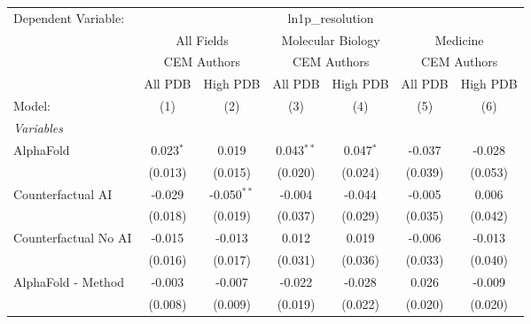 \begingroup
\centering
\begin{tabular}{lcccccc}
   \tabularnewline \midrule \midrule
   Dependent Variable: & \multicolumn{6}{c}{ln1p\_resolution}\\
 & \multicolumn{2}{c}{All Fields} & \multicolumn{2}{c}{Molecular Biology} & \multicolumn{2}{c}{Medicine} \\
\cmidrule(lr){2-3} \cmidrule(lr){4-5} \cmidrule(lr){6-7}
 & \multicolumn{2}{c}{CEM Authors} & \multicolumn{2}{c}{CEM Authors} & \multicolumn{2}{c}{CEM Authors} \\
\cmidrule(lr){2-3} \cmidrule(lr){4-5} \cmidrule(lr){6-7}
 & \multicolumn{1}{c}{All PDB} & \multicolumn{1}{c}{High PDB} & \multicolumn{1}{c}{All PDB} & \multicolumn{1}{c}{High PDB} & \multicolumn{1}{c}{All PDB} & \multicolumn{1}{c}{High PDB} \\
\cmidrule(lr){2-2} \cmidrule(lr){3-3} \cmidrule(lr){4-4} \cmidrule(lr){5-5} \cmidrule(lr){6-6} \cmidrule(lr){7-7}
   Model:                                                     & (1)         & (2)           & (3)           & (4)          & (5)           & (6)\\  
   \midrule
   \emph{Variables}\\
   AlphaFold                                                  & 0.023$^{*}$ & 0.019         & 0.043$^{**}$  & 0.047$^{*}$  & -0.037        & -0.028\\   
                                                              & (0.013)     & (0.015)       & (0.020)       & (0.024)      & (0.039)       & (0.053)\\   
   Counterfactual AI                                          & -0.029      & -0.050$^{**}$ & -0.004        & -0.044       & -0.005        & 0.006\\   
                                                              & (0.018)     & (0.019)       & (0.037)       & (0.029)      & (0.035)       & (0.042)\\   
   Counterfactual No AI                                       & -0.015      & -0.013        & 0.012         & 0.019        & -0.006        & -0.013\\   
                                                              & (0.016)     & (0.017)       & (0.031)       & (0.036)      & (0.033)       & (0.040)\\   
   AlphaFold - Method                                         & -0.003      & -0.007        & -0.022        & -0.028       & 0.026         & -0.009\\   
                                                              & (0.008)     & (0.009)       & (0.019)       & (0.022)      & (0.020)       & (0.020)\\   

\end{tabular}
